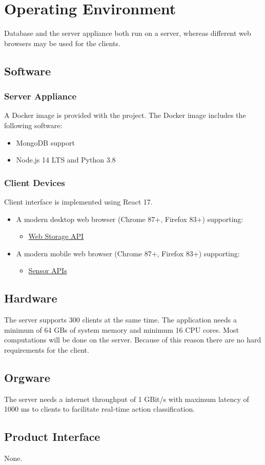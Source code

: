 \section{Operating Environment}

Database and the server appliance both run on a server, whereas different web browsers may be used for the clients.

\subsection{Software}
\subsubsection{Server Appliance}
A Docker image is provided with the project. The Docker image includes the following software:
\begin{itemize}
    \item MongoDB support
    \item Node.js 14 LTS and Python 3.8
\end{itemize}
\subsubsection{Client Devices}
Client interface is implemented using React 17.
\begin{itemize}
    \item A modern desktop web browser (Chrome 87+, Firefox 83+) supporting:
    \begin{itemize}
        \item \href{https://developer.mozilla.org/en-US/docs/Web/API/Web_Storage_API}{Web Storage API}
    \end{itemize}
    \item A modern mobile web browser (Chrome 87+, Firefox 83+) supporting:
    \begin{itemize}
        \item \href{https://developer.mozilla.org/en-US/docs/Web/API/Sensor_APIs}{Sensor APIs}
    \end{itemize}
\end{itemize}

\subsection{Hardware}

The server supports 300 clients at the same time. The application needs a minimum of 64 GBs of system memory and minimum 16 CPU cores. Most computations will be done on the server. Because of this reason there are no hard requirements for the client.

\subsection{Orgware}
The server needs a internet throughput of 1 GBit/s with maximum latency of 1000 ms to clients to facilitate real-time action classification.

\subsection{Product Interface}
None.